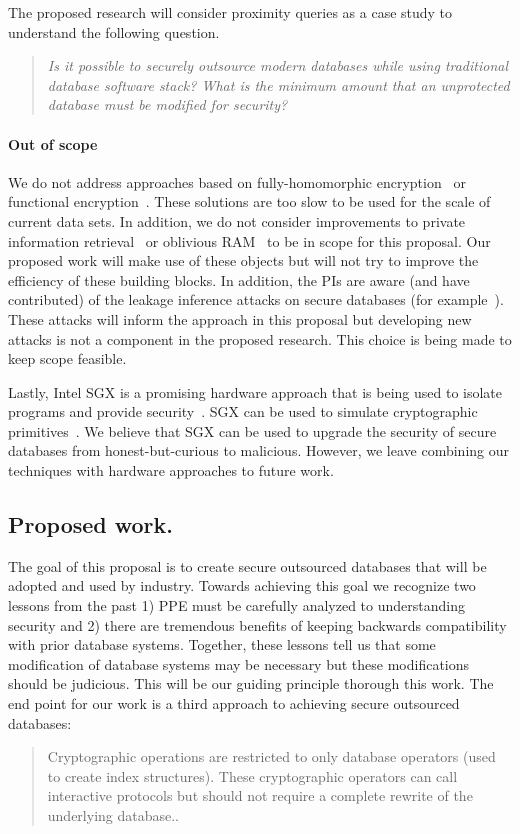 The proposed research will
consider proximity queries as a case study to understand the following question.  \begin{quote}\emph{Is it possible to securely outsource modern databases while using traditional database software stack?  What is the minimum amount that an unprotected database must be modified for security?}\end{quote}


\paragraph{Out of scope} We do not address approaches based on fully-homomorphic encryption~\cite{STOC:Gentry09} or functional encryption~\cite{FOCS:GGHRSW13}.  These solutions are too slow to be used for the scale of current data sets.  In addition, we do not consider improvements to private information retrieval~\cite{FOCS:CGKS95} or oblivious RAM~\cite{STOC:Goldreich87,goldreich1996software} to be in scope for this proposal.  Our proposed work will make use of these objects but will not try to improve the efficiency of these building blocks.  In addition, the PIs are aware (and have contributed) of the leakage inference attacks on secure databases (for example~\cite{CCS:KKNO16}).  These attacks will inform the approach in this proposal but developing new attacks is not a component in the proposed research.  This choice is being made to keep scope feasible.

Lastly, Intel SGX is a promising hardware approach that is being used to isolate programs and provide security~\cite{EPRINT:CosDev16}.  SGX can be used to simulate cryptographic primitives~\cite{EPRINT:SasGorFle17,EPRINT:FVBG16}.  We believe that SGX can be used to upgrade the security of secure databases from honest-but-curious to malicious.  However, we leave combining our techniques with hardware approaches to future work.


\subsection{Proposed work.}
The goal of this proposal is to create secure outsourced databases that will be adopted and used by industry.  Towards achieving this goal we recognize two lessons from the past 1) PPE must be carefully analyzed to understanding security and 2) there are tremendous benefits of keeping backwards compatibility with prior database systems.  Together, these lessons tell us that some modification of database systems may be necessary but these modifications should be judicious.  This will be our guiding principle thorough this work.  The end point for our work is a  third approach to achieving secure outsourced databases: 
\begin{quote}Cryptographic operations are restricted to only database operators (used to create index structures).  These cryptographic operators can call interactive protocols but should not require a complete rewrite of the underlying database.. 
\end{quote}


